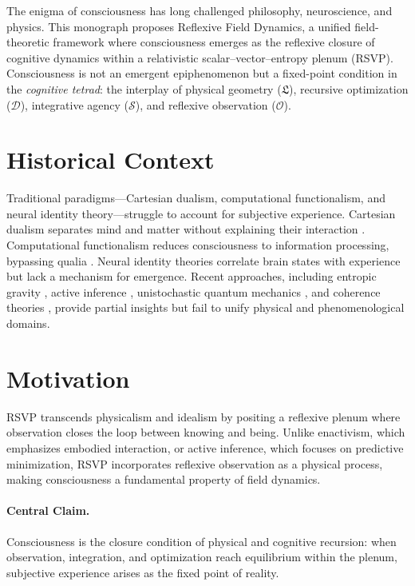 \documentclass[12pt]{book}
\theoremstyle{definition}
\begin{document}
{\sloppy
The enigma of consciousness has long challenged philosophy, neuroscience, and physics. This monograph proposes Reflexive Field Dynamics, a unified field-theoretic framework where consciousness emerges as the reflexive closure of cognitive dynamics within a relativistic scalar–vector–entropy plenum (RSVP). Consciousness is not an emergent epiphenomenon but a fixed-point condition in the \emph{cognitive tetrad}: the interplay of physical geometry (\(\mathfrak{L}\)), recursive optimization (\(\mathcal{D}\)), integrative agency (\(\mathcal{S}\)), and reflexive observation (\(\mathcal{O}\)).
}

\section{Historical Context}
\label{sec:historical}
{\sloppy
Traditional paradigms—Cartesian dualism, computational functionalism, and neural identity theory—struggle to account for subjective experience. Cartesian dualism separates mind and matter without explaining their interaction \cite{descartes1641meditations}. Computational functionalism reduces consciousness to information processing, bypassing qualia \cite{chalmers1996conscious}. Neural identity theories correlate brain states with experience but lack a mechanism for emergence. Recent approaches, including entropic gravity \cite{jacobson1995thermodynamics, verlinde2011origin, gibbs2025entropic}, active inference \cite{friston2023active, friston2025beautiful}, unistochastic quantum mechanics \cite{barandes2024new, barandes2025unistochastic}, and coherence theories \cite{logan2024unified, logan2025coherence}, provide partial insights but fail to unify physical and phenomenological domains.
}

\section{Motivation}
\label{sec:motivation}
RSVP transcends physicalism and idealism by positing a reflexive plenum where observation closes the loop between knowing and being. Unlike enactivism, which emphasizes embodied interaction, or active inference, which focuses on predictive minimization, RSVP incorporates reflexive observation as a physical process, making consciousness a fundamental property of field dynamics.

\paragraph{Central Claim.} Consciousness is the closure condition of physical and cognitive recursion: when observation, integration, and optimization reach equilibrium within the plenum, subjective experience arises as the fixed point of reality.
\end{document}
